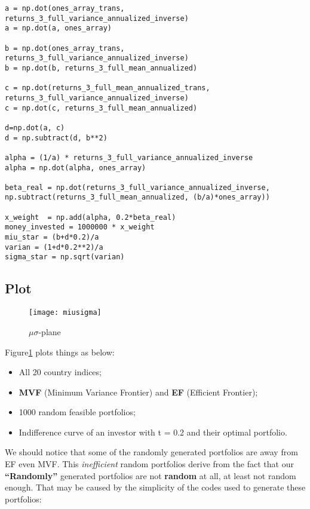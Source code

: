 \documentclass[
]{article}
\begin{document}
\begin{verbatim}
a = np.dot(ones_array_trans, returns_3_full_variance_annualized_inverse)
a = np.dot(a, ones_array)

b = np.dot(ones_array_trans, returns_3_full_variance_annualized_inverse)
b = np.dot(b, returns_3_full_mean_annualized)

c = np.dot(returns_3_full_mean_annualized_trans, 
returns_3_full_variance_annualized_inverse)
c = np.dot(c, returns_3_full_mean_annualized)

d=np.dot(a, c)
d = np.subtract(d, b**2)

alpha = (1/a) * returns_3_full_variance_annualized_inverse
alpha = np.dot(alpha, ones_array)

beta_real = np.dot(returns_3_full_variance_annualized_inverse,
np.subtract(returns_3_full_mean_annualized, (b/a)*ones_array))

x_weight  = np.add(alpha, 0.2*beta_real)
money_invested = 1000000 * x_weight
miu_star = (b+d*0.2)/a
varian = (1+d*0.2**2)/a
sigma_star = np.sqrt(varian)
\end{verbatim}

\hypertarget{plot}{%
\subsection{Plot}\label{plot}}

\begin{figure}[!htb]
\texttt{[image: miusigma]}
\caption{$\mu\sigma$-plane}\label{miusigma}
\end{figure}

Figure\ref{miusigma} plots things as below:

\begin{itemize}
\item
  All 20 country indices;
\item
  \textbf{MVF} (Minimum Variance Frontier) and \textbf{EF} (Efficient
  Frontier);
\item
  1000 random feasible portfolios;
\item
  Indifference curve of an investor with t = 0.2 and their optimal
  portfolio.
\end{itemize}

We should notice that some of the randomly generated portfolios are away
from EF even MVF. This \emph{inefficient} random portfolios derive from
the fact that our \textbf{``Randomly''} generated portfolios are not
\textbf{random} at all, at least not random enough. That may be caused
by the simplicity of the codes used to generate these portfolios:
\end{document}
